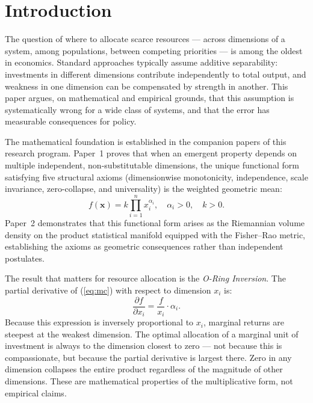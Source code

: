 \documentclass[12pt]{article}
\begin{document}
\onehalfspacing

\section{Introduction}
\label{sec:intro}

The question of where to allocate scarce resources --- across dimensions of a system, among populations, between competing priorities --- is among the oldest in economics. Standard approaches typically assume additive separability: investments in different dimensions contribute independently to total output, and weakness in one dimension can be compensated by strength in another. This paper argues, on mathematical and empirical grounds, that this assumption is systematically wrong for a wide class of systems, and that the error has measurable consequences for policy.

The mathematical foundation is established in the companion papers of this research program. Paper~1 \citep{kirsch2026mc} proves that when an emergent property depends on multiple independent, non-substitutable dimensions, the unique functional form satisfying five structural axioms (dimensionwise monotonicity, independence, scale invariance, zero-collapse, and universality) is the weighted geometric mean:
\begin{equation}
\label{eq:mc}
f(\mathbf{x}) = k \prod_{i=1}^{n} x_i^{\alpha_i}, \quad \alpha_i > 0, \quad k > 0.
\end{equation}
Paper~2 \citep{kirsch2026geom} demonstrates that this functional form arises as the Riemannian volume density on the product statistical manifold equipped with the Fisher--Rao metric, establishing the axioms as geometric consequences rather than independent postulates.

The result that matters for resource allocation is the \emph{O-Ring Inversion}. The partial derivative of (\ref{eq:mc}) with respect to dimension $x_i$ is:
\begin{equation}
\label{eq:inversion}
\frac{\partial f}{\partial x_i} = \frac{f}{x_i} \cdot \alpha_i.
\end{equation}
Because this expression is inversely proportional to $x_i$, marginal returns are steepest at the weakest dimension. The optimal allocation of a marginal unit of investment is always to the dimension closest to zero --- not because this is compassionate, but because the partial derivative is largest there. Zero in any dimension collapses the entire product regardless of the magnitude of other dimensions. These are mathematical properties of the multiplicative form, not empirical claims.
\end{document}
